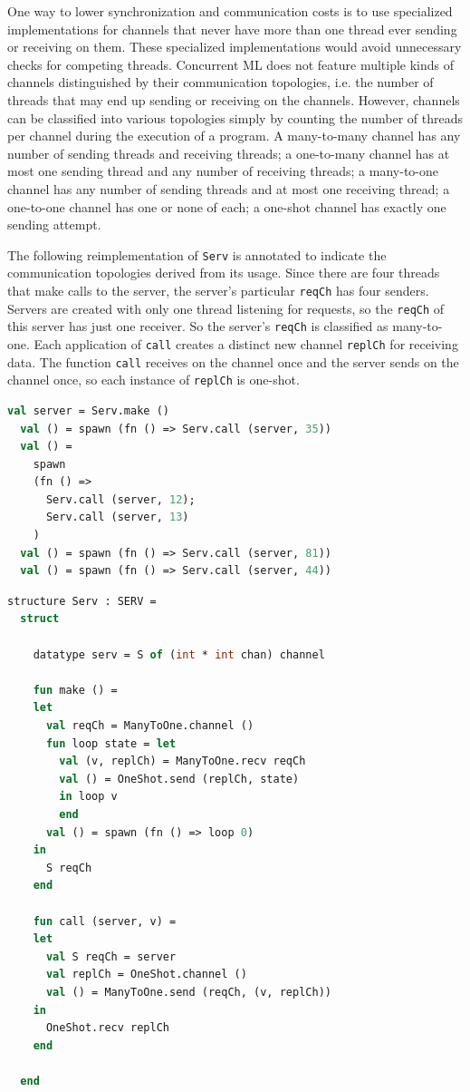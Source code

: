 \documentclass[10pt]{article}
\begin{document}
One way to lower synchronization and communication costs is to use specialized implementations
for channels that never have more than one thread ever sending or receiving on them. These
specialized implementations would avoid unnecessary checks for competing threads.
Concurrent ML does not feature multiple kinds of channels distinguished by their communication
topologies, i.e. the number of threads that may end up sending or receiving on the channels.
However, channels can be classified into various topologies simply by counting the number of
threads per channel during the execution of a program.  A many-to-many channel has any number
of sending threads and receiving threads;
a one-to-many channel has at most one sending thread and
any number of receiving threads;
a many-to-one channel has any number of sending threads and at most one receiving thread;
a one-to-one channel has one or none of each;
a one-shot channel has exactly one sending attempt.

The following reimplementation of \lstinline{Serv} is annotated to indicate the communication topologies
derived from its usage. Since there are four threads that make calls to the server, the
server's particular \lstinline{reqCh} has four senders.  Servers are created with only one
thread listening for requests, so the \lstinline{reqCh} of this server has just one receiver.
So the server's \lstinline{reqCh} is classified as many-to-one.
Each application of \lstinline{call} creates a distinct
new channel \lstinline{replCh} for receiving data.  The function \lstinline{call} receives on the channel
once and the server sends on the channel once, so each instance of \lstinline{replCh} is
one-shot.

\begin{lstlisting}[language=ML, mathescape]
  val server = Serv.make ()
  val () = spawn (fn () => Serv.call (server, 35))
  val () =
    spawn
    (fn () => 
      Serv.call (server, 12); 
      Serv.call (server, 13)
    )
  val () = spawn (fn () => Serv.call (server, 81))
  val () = spawn (fn () => Serv.call (server, 44))
\end{lstlisting}

\begin{lstlisting}[language=ML, mathescape]
  structure Serv : SERV =
  struct 

    datatype serv = S of (int * int chan) channel 

    fun make () =
    let 
      val reqCh = ManyToOne.channel ()
      fun loop state = let
        val (v, replCh) = ManyToOne.recv reqCh
        val () = OneShot.send (replCh, state)
        in loop v
        end
      val () = spawn (fn () => loop 0)
    in
      S reqCh
    end 

    fun call (server, v) =
    let 
      val S reqCh = server
      val replCh = OneShot.channel ()
      val () = ManyToOne.send (reqCh, (v, replCh))
    in
      OneShot.recv replCh
    end

  end
\end{lstlisting}
\end{document}
